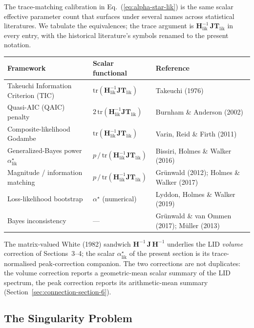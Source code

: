 \documentclass[11pt]{article}
\begin{document}
The trace-matching calibration in Eq.~(\ref{eq:alpha-star-lik}) is the same scalar effective parameter count that surfaces under several names across statistical literatures. We tabulate the equivalences; the trace argument is $\mathbf H_{\mathrm{lik}}^{-1}\,\mathbf{JT}_{\mathrm{lik}}$ in every entry, with the historical literature's symbols renamed to the present notation.
\begin{center}
\begin{tabular}{lll}
\hline
Framework & Scalar functional & Reference \\
\hline
Takeuchi Information Criterion (TIC) & $\mathrm{tr}(\mathbf H_{\mathrm{lik}}^{-1}\mathbf{JT}_{\mathrm{lik}})$ & Takeuchi (1976) \\
Quasi-AIC (QAIC) penalty & $2\,\mathrm{tr}(\mathbf H_{\mathrm{lik}}^{-1}\mathbf{JT}_{\mathrm{lik}})$ & Burnham \& Anderson (2002) \\
Composite-likelihood Godambe & $\mathrm{tr}(\mathbf H_{\mathrm{lik}}^{-1}\mathbf{JT}_{\mathrm{lik}})$ & Varin, Reid \& Firth (2011) \\
Generalized-Bayes power $\alpha^\star_{\mathrm{lik}}$ & $p\,/\,\mathrm{tr}(\mathbf H_{\mathrm{lik}}^{-1}\mathbf{JT}_{\mathrm{lik}})$ & Bissiri, Holmes \& Walker (2016) \\
Magnitude / information matching & $p\,/\,\mathrm{tr}(\mathbf H_{\mathrm{lik}}^{-1}\mathbf{JT}_{\mathrm{lik}})$ & Gr\"unwald (2012); Holmes \& Walker (2017) \\
Loss-likelihood bootstrap & $\alpha^\star$ (numerical) & Lyddon, Holmes \& Walker (2019) \\
Bayes inconsistency & --- & Gr\"unwald \& van Ommen (2017); M\"uller (2013) \\
\hline
\end{tabular}
\end{center}
The matrix-valued White (1982) sandwich $\mathbf H^{-1}\,\mathbf J\,\mathbf H^{-1}$ underlies the LID \emph{volume} correction of Sections~3--4; the scalar $\alpha^\star_{\mathrm{lik}}$ of the present section is its trace-normalised peak-correction companion. The two corrections are not duplicates: the volume correction reports a geometric-mean scalar summary of the LID spectrum, the peak correction reports its arithmetic-mean summary (Section~\ref{sec:connection-section-6}).

\subsection{The Singularity Problem}
\label{sec:singularity-lik}
\end{document}
